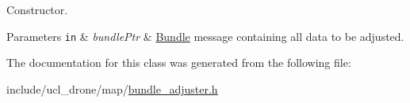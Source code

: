 Constructor. 


\begin{DoxyParams}[1]{Parameters}
\mbox{\tt in}  & {\em bundle\+Ptr} & \hyperlink{classBundle}{Bundle} message containing all data to be adjusted. \\
\hline
\end{DoxyParams}


The documentation for this class was generated from the following file\+:\begin{DoxyCompactItemize}
\item 
include/ucl\+\_\+drone/map/\hyperlink{bundle__adjuster_8h}{bundle\+\_\+adjuster.\+h}\end{DoxyCompactItemize}
